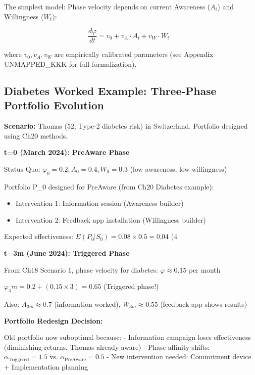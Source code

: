 The simplest model: Phase velocity depends on current Awareness ($A_t$) and Willingness ($W_t$):

\begin{equation}
\frac{d\varphi}{dt} = v_0 + v_A \cdot A_t + v_W \cdot W_t
\label{eq:21-phase-velocity}
\end{equation}

where $v_0, v_A, v_W$ are empirically calibrated parameters (see Appendix UNMAPPED_KKK for full formalization).

\subsection{Diabetes Worked Example: Three-Phase Portfolio Evolution}

\textbf{Scenario:} Thomas (52, Type-2 diabetes risk) in Switzerland. Portfolio designed using Ch20 methods.

\textbf{t=0 (March 2024): PreAware Phase}

Status Quo: $\varphi_0 = 0.2, A_0 = 0.4, W_0 = 0.3$ (low awareness, low willingness)

Portfolio P_0 designed for PreAware (from Ch20 Diabetes example):
\begin{itemize}[nosep]
\item Intervention 1: Information session (Awareness builder)
\item Intervention 2: Feedback app installation (Willingness builder)
\end{itemize}

Expected effectiveness: $E(P_0 | S_0) = 0.08 \times 0.5 = 0.04$ (4%

\textbf{t=3m (June 2024): Triggered Phase}

From Ch18 Scenario 1, phase velocity for diabetes: $\dot{\varphi} \approx 0.15$ per month

$\varphi_3m = 0.2 + (0.15 \times 3) = 0.65$ (Triggered phase!)

Also: $A_{3m} \approx 0.7$ (information worked), $W_{3m} \approx 0.55$ (feedback app shows results)

\textbf{Portfolio Redesign Decision:}

Old portfolio now suboptimal because:
- Information campaign loses effectiveness (diminishing returns, Thomas already aware)
- Phase-affinity shifts: $\alpha_{\text{Triggered}} = 1.5$ vs. $\alpha_{\text{PreAware}} = 0.5$
- New intervention needed: Commitment device + Implementation planning

